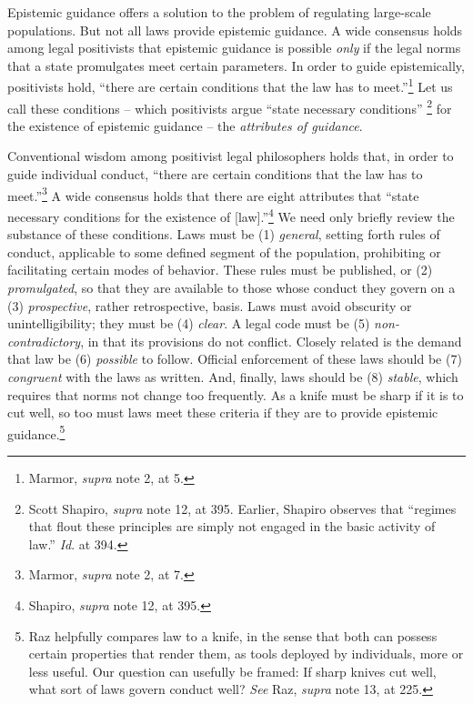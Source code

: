 Epistemic guidance offers a solution to the problem of regulating
large-scale populations. But not all laws provide epistemic guidance. A
wide consensus holds among legal positivists that epistemic guidance is
possible \emph{only} if the legal norms that a state promulgates meet
certain parameters. In order to guide epistemically, positivists hold,
``there are certain conditions that the law has to meet.''\footnote{Marmor,
  \emph{supra} note 2, at 5.} Let us call these conditions -- which
positivists argue ``state necessary conditions'' \footnote{Scott
  Shapiro, \emph{supra} note 12, at 395. Earlier, Shapiro observes that
  ``regimes that flout these principles are simply not engaged in the
  basic activity of law.'' \emph{Id}. at 394.} for the existence of
epistemic guidance -- the \emph{attributes of guidance}.

Conventional wisdom among positivist legal philosophers holds that, in
order to guide individual conduct, ``there are certain conditions that
the law has to meet.''\footnote{Marmor, \emph{supra} note 2, at 7.} A
wide consensus holds that there are eight attributes that ``state
necessary conditions for the existence of {[}law{]}.''\footnote{Shapiro,
  \emph{supra} note 12, at 395.} We need only briefly review the
substance of these conditions. Laws must be (1) \emph{general}, setting
forth rules of conduct, applicable to some defined segment of the
population, prohibiting or facilitating certain modes of behavior. These
rules must be published, or (2) \emph{promulgated}, so that they are
available to those whose conduct they govern on a (3)
\emph{prospective}, rather retrospective, basis. Laws must avoid
obscurity or unintelligibility; they must be (4) \emph{clear}. A legal
code must be (5) \emph{non-contradictory}, in that its provisions do not
conflict. Closely related is the demand that law be (6) \emph{possible}
to follow. Official enforcement of these laws should be (7)
\emph{congruent} with the laws as written. And, finally, laws should be
(8) \emph{stable}, which requires that norms not change too frequently.
As a knife must be sharp if it is to cut well, so too must laws meet
these criteria if they are to provide epistemic guidance.\footnote{Raz
  helpfully compares law to a knife, in the sense that both can possess
  certain properties that render them, as tools deployed by individuals,
  more or less useful. Our question can usefully be framed: If sharp
  knives cut well, what sort of laws govern conduct well? \emph{See}
  Raz, \emph{supra} note 13, at 225.}

